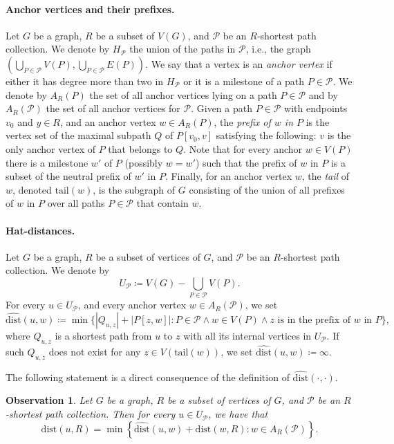 \documentclass[11pt,a4paper]{article}
\newtheorem{observation}{Observation}[section]
\newcommand{\dist}{\mathrm{dist}}
\begin{document}
\paragraph{Anchor vertices and their prefixes.}
Let $G$ be a graph, $R$ be a subset of $V(G)$, and $\mathcal{P}$ be an $R$-shortest path collection. We denote by $H_{\mathcal{P}}$ the union of the paths in $\mathcal{P}$, i.e., the graph $(\bigcup_{P\in\mathcal{P}}V(P),\bigcup_{P\in\mathcal{P}}E(P))$.
We say that a vertex is an \emph{anchor vertex} if either it has degree more than two in $H_{\mathcal{P}}$
or it is a milestone of a path $P \in \mathcal{P}$.
We denote by $A_R(P)$ the set of all anchor vertices lying on a path $P \in \mathcal{P}$
and by $A_R(\mathcal{P})$ the set of all anchor vertices for $\mathcal{P}$.
Given a path $P\in\mathcal{P}$ with endpoints $v_0$ and $y\in R$, and an anchor vertex $w\in A_R(P)$,
the \emph{prefix of $w$ in $P$} is the vertex set of the maximal subpath $Q$ of
$P[v_0,v]$ satisfying the following: $v$ is the only anchor vertex of $P$ that belongs to $Q$.
Note that for every anchor $w\in V(P)$ there is a milestone $w'$ of $P$ (possibly $w=w'$)
such that the prefix of $w$ in $P$ is a subset of the neutral prefix of $w'$ in $P$.
Finally, for an anchor vertex $w$, the \emph{tail} of $w$, 
denoted $\mathrm{tail}(w)$, is the subgraph of $G$ consisting
of the union of all prefixes of $w$ in $P$ over all paths $P \in \mathcal{P}$ that contain $w$.

\paragraph{Hat-distances.}
Let $G$ be a graph, $R$ be a subset of vertices of $G$, and $\mathcal{P}$ be an $R$-shortest path collection.
We denote by $$U_{\mathcal{P}}\coloneqq V(G)-\bigcup_{P\in\mathcal{P}}V(P).$$
For every $u\in U_{\mathcal{P}}$,
and every anchor vertex $w\in A_R(\mathcal{P})$,
we set 
\[ \widehat{\dist}(u,w)\coloneqq \min\{|Q_{u,z}|+|P[z,w]|\colon
P \in \mathcal{P} \wedge w \in V(P) \wedge 
z\text{ is in the prefix of $w$ in $P$}\},\] 
where $Q_{u,z}$ is a shortest path from $u$ to $z$ with all its internal vertices in $U_{\mathcal{P}}$.
If such $Q_{u,z}$ does not exist for any $z \in V(\mathrm{tail}(w))$,
we set $\widehat{\dist}(u, w) \coloneqq \infty$. 

The following statement is a direct consequence of the definition of $\widehat{\dist}(\cdot,\cdot)$.

\begin{observation}
  \label{obs:dist}
  Let $G$ be a graph, $R$ be a subset of vertices of $G$, and $\mathcal{P}$ be
  an $R$-shortest path collection.
  Then for every $u\in U_{\mathcal{P}}$, we have that $$\dist(u,R)=\min \left\{\widehat{\dist}(u,w)+ \dist(w,R)
  \colon w\in A_R(\mathcal{P})\right\}.$$
\end{observation}
\end{document}
